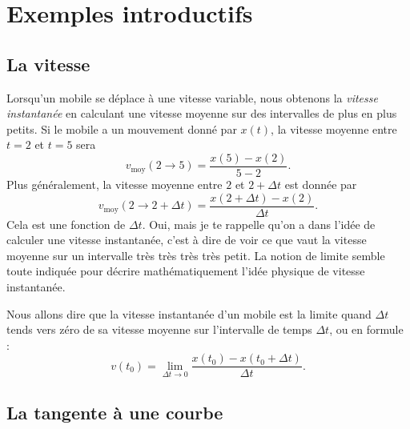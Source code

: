 \section{Exemples introductifs}

\subsection{La vitesse}

Lorsqu'un mobile se déplace à une vitesse variable, nous obtenons la \emph{vitesse instantanée} en calculant une vitesse moyenne sur des intervalles de plus en plus petits. Si le mobile a un mouvement donné par $x(t)$, la vitesse moyenne entre $t=2$ et $t=5$ sera
\[ 
  v_{\text{moy}}(2\to 5)=\frac{ x(5)-x(2) }{ 5-2 }.
\]
Plus généralement, la vitesse moyenne entre $2$ et $2+\Delta t$ est donnée par
\[ 
  v_{\text{moy}}(2\to 2+\Delta t)=\frac{ x(2+\Delta t)-x(2) }{ \Delta t }.
\]
Cela est une fonction de $\Delta t$. Oui, mais je te rappelle qu'on a dans l'idée de calculer une vitesse instantanée, c'est à dire de voir ce que vaut la vitesse moyenne sur un intervalle très {\small très} {\footnotesize très} {\scriptsize très} {\tiny petit}. La notion de limite semble toute indiquée pour décrire mathématiquement l'idée physique de vitesse instantanée.

Nous allons dire que la vitesse instantanée d'un mobile est la limite quand $\Delta t$ tends vers zéro de sa vitesse moyenne sur l'intervalle de temps $\Delta t$, ou en formule :
\begin{equation}		\label{Eqvinstlimite}
	v(t_0)=\lim_{\Delta t\to 0}\frac{ x(t_0)-x(t_0+\Delta t) }{ \Delta t }.
\end{equation}

\subsection{La tangente à une courbe}

